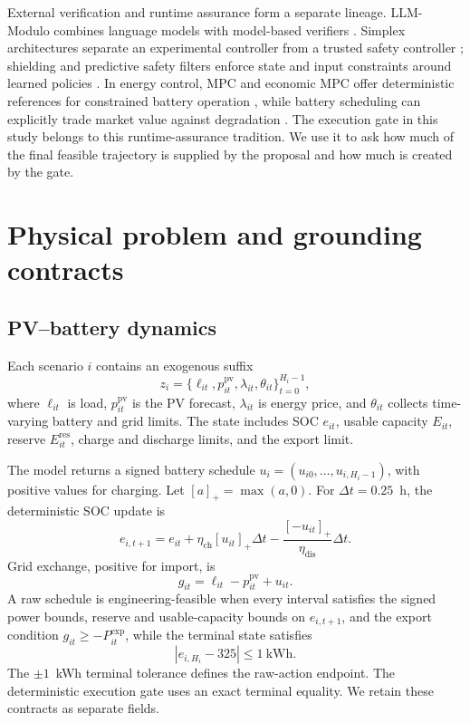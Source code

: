 \documentclass[11pt]{article}
\begin{document}
External verification and runtime assurance form a separate lineage. LLM-Modulo combines language
models with model-based verifiers \cite{kambhampati2024llmmodulo}. Simplex architectures separate
an experimental controller from a trusted safety controller \cite{seto1998simplex}; shielding and
predictive safety filters enforce state and input constraints around learned policies
\cite{alshiekh2018shielding,wabersich2021safetyfilter}. In energy control, MPC and economic MPC offer
deterministic references for constrained battery operation \cite{parisio2014mpc,banfield2020empc},
while battery scheduling can explicitly trade market value against degradation
\cite{sarker2017battery}. The execution gate in this study belongs to this runtime-assurance
tradition. We use it to ask how much of the final feasible trajectory is supplied by the proposal
and how much is created by the gate.

\section{Physical problem and grounding contracts}
\label{sec:formalization}

\subsection{PV--battery dynamics}

Each scenario $i$ contains an exogenous suffix
\begin{equation}
 z_i=\{\ell_{it},p^{\mathrm{pv}}_{it},\lambda_{it},\theta_{it}\}_{t=0}^{H_i-1},
 \label{eq:exogenous}
\end{equation}
where $\ell_{it}$ is load, $p^{\mathrm{pv}}_{it}$ is the PV forecast, $\lambda_{it}$ is energy
price, and $\theta_{it}$ collects time-varying battery and grid limits. The state includes SOC
$e_{it}$, usable capacity $E_{it}$, reserve $E^{\mathrm{res}}_{it}$, charge and discharge limits,
and the export limit.

The model returns a signed battery schedule
$u_i=(u_{i0},\ldots,u_{i,H_i-1})$, with positive values for charging. Let
$[a]_+=\max(a,0)$. For $\Delta t=0.25$~h, the deterministic SOC update is
\begin{equation}
 e_{i,t+1}=e_{it}+\eta_{\mathrm{ch}}[u_{it}]_+\Delta t
 -\frac{[-u_{it}]_+}{\eta_{\mathrm{dis}}}\Delta t.
 \label{eq:soc}
\end{equation}
Grid exchange, positive for import, is
\begin{equation}
 g_{it}=\ell_{it}-p^{\mathrm{pv}}_{it}+u_{it}.
 \label{eq:grid}
\end{equation}
A raw schedule is engineering-feasible when every interval satisfies the signed power bounds,
reserve and usable-capacity bounds on $e_{i,t+1}$, and the export condition
$g_{it}\ge -P^{\mathrm{exp}}_{it}$, while the terminal state satisfies
\begin{equation}
 |e_{i,H_i}-325|\le 1\ \mathrm{kWh}.
 \label{eq:terminal}
\end{equation}
The $\pm1$~kWh terminal tolerance defines the raw-action endpoint. The deterministic execution gate
uses an exact terminal equality. We retain these contracts as separate fields.
\end{document}
